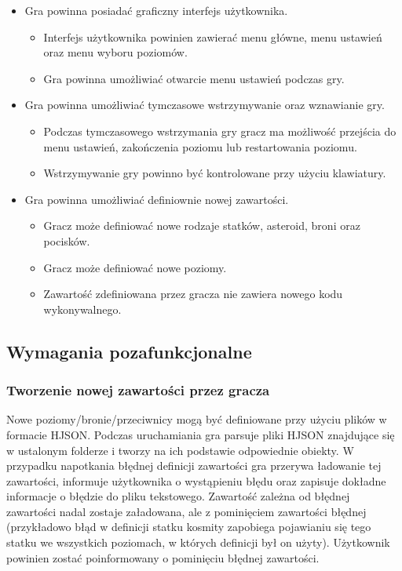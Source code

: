 \documentclass{article}
\begin{document}
\begin{itemize}
\begin{itemize}
				\end{itemize}
				
				\item Gra powinna posiadać graficzny interfejs użytkownika.
				\begin{itemize}
					\item Interfejs użytkownika powinien zawierać menu główne, menu ustawień oraz menu wyboru poziomów.
					\item Gra powinna umożliwiać otwarcie menu ustawień podczas gry.
				\end{itemize}
				
				\item Gra powinna umożliwiać tymczasowe wstrzymywanie oraz wznawianie gry.
				\begin{itemize}
					\item Podczas tymczasowego wstrzymania gry gracz ma możliwość przejścia do menu ustawień, zakończenia poziomu lub restartowania poziomu.
					\item Wstrzymywanie gry powinno być kontrolowane przy użyciu klawiatury.
				\end{itemize}
				
				\item Gra powinna umożliwiać definiownie nowej zawartości.
				\begin{itemize}
					\item Gracz może definiować nowe rodzaje statków, asteroid, broni oraz pocisków.
					\item Gracz może definiować nowe poziomy.
					\item Zawartość zdefiniowana przez gracza nie zawiera nowego kodu wykonywalnego.
				\end{itemize}
				
			\end{itemize}
				

		\subsection{Wymagania pozafunkcjonalne}
				
			\subsubsection{Tworzenie nowej zawartości przez gracza}
				Nowe poziomy/bronie/przeciwnicy mogą być definiowane przy użyciu plików w formacie HJSON. Podczas uruchamiania gra parsuje pliki HJSON znajdujące się w ustalonym folderze i tworzy na ich podstawie odpowiednie obiekty. W przypadku napotkania błędnej definicji zawartości gra przerywa ładowanie tej zawartości, informuje użytkownika o wystąpieniu błędu oraz zapisuje dokładne informacje o błędzie do pliku tekstowego. Zawartość zależna od błędnej zawartości nadal zostaje załadowana, ale z pominięciem zawartości błędnej (przykładowo błąd w definicji statku kosmity zapobiega pojawianiu się tego statku we wszystkich poziomach, w których definicji był on użyty). Użytkownik powinien zostać poinformowany o pominięciu błędnej zawartości.
				
\end{document}
